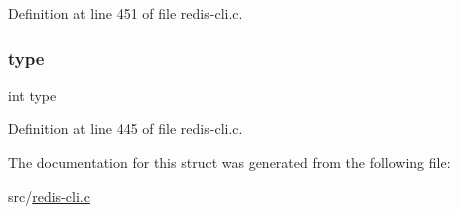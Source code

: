 Definition at line 451 of file redis-\/cli.\+c.

\mbox{\label{structhelp_entry_ac765329451135abec74c45e1897abf26}} 
\subsubsection{\texorpdfstring{type}{type}}
{\footnotesize\ttfamily int type}



Definition at line 445 of file redis-\/cli.\+c.



The documentation for this struct was generated from the following file\+:\begin{DoxyCompactItemize}
\item 
src/\hyperlink{redis-cli_8c}{redis-\/cli.\+c}\end{DoxyCompactItemize}
